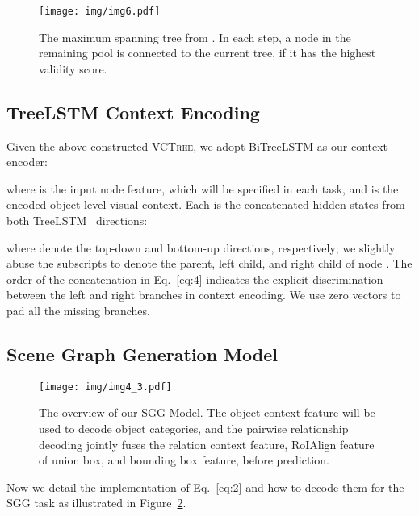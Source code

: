 \documentclass[10pt,twocolumn,letterpaper]{article}
\begin{document}
\begin{figure}
   \begin{minipage}[b]{1.0\linewidth}
   \centerline{\texttt{[image: img/img6.pdf]}}
   \end{minipage}
   \caption{The maximum spanning tree from . In each step, a node in the remaining pool is connected to the current tree, if it has the highest validity score.}
   \vspace{-0.15in}
  \label{fig:3} \end{figure}

\subsection{TreeLSTM Context Encoding}
\label{subsection:3_2}
Given the above constructed \textsc{VCTree}, we adopt BiTreeLSTM as our context encoder:

where  is the input node feature, which will be specified in each task, and  is the encoded object-level visual context. Each  is the concatenated hidden states from both TreeLSTM~\cite{tai2015improved} directions:

where  denote the top-down and bottom-up directions, respectively; we slightly abuse the subscripts  to denote the parent, left child, and right child of node . The order of the concatenation  in Eq.~\eqref{eq:4} indicates the explicit discrimination between the left and right branches in context encoding. We use zero vectors to pad all the missing branches.




\subsection{Scene Graph Generation Model}
\label{subsection:3_3}

\begin{figure}
   \begin{minipage}[b]{1.0\linewidth}
   \centerline{\texttt{[image: img/img4\_3.pdf]}}
   \end{minipage}
   \caption{The overview of our SGG Model. The object context feature will be used to decode object categories, and the pairwise relationship decoding jointly fuses the relation context feature, RoIAlign feature of union box, and bounding box feature, before prediction.}
   \vspace{-0.1in}
   \label{fig:4} \end{figure}
Now we detail the implementation of Eq.~\eqref{eq:2} and how to decode them for the SGG task as illustrated in Figure~\ref{fig:4}. 
\end{document}

